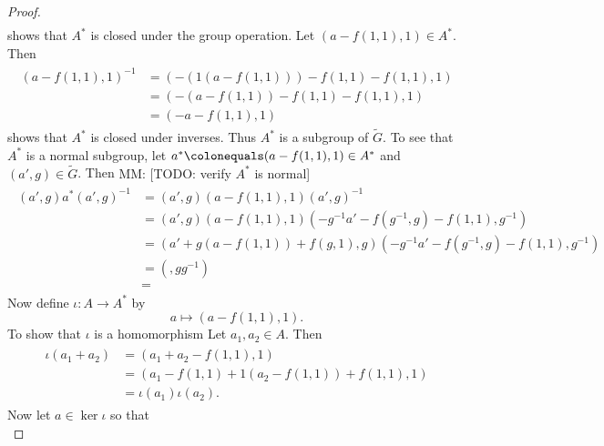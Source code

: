 \documentclass{dcthesis}
\newcommand{\mm}[1]{{\color{blue} \sf MM: [#1]}}
\newcommand{\wt}[1]{\widetilde{#1}}
\renewcommand{\ker}{\operatorname{ker}}
\theoremstyle{definition}
\theoremstyle{remark}
\numberwithin{equation}{section}
\numberwithin{figure}{section}
\begin{document}
{{\begin{proof}
\begin{align}
      \end{align}
      shows that $A^*$ is closed under the group operation.
      Let $(a-f(1,1),1)\in A^*$.
      Then
      \begin{align}
        \label{eqn:subgroupinversesAstar}
        \begin{split}
          (a-f(1,1),1)^{-1}
          &=(-(1(a-f(1,1)))-f(1,1)-f(1,1), 1)\\
          &=(-(a-f(1,1))-f(1,1)-f(1,1), 1)\\
          &=(-a-f(1,1), 1)
        \end{split}
      \end{align}
      shows that $A^*$ is closed under inverses.
      Thus $A^*$ is a subgroup of $\wt{G}$.
      To see that $A^*$ is a normal subgroup,
      let $a^*\colonequals (a-f(1,1),1)\in A^*$
      and $(a',g)\in\wt{G}$.
      Then
      \mm{TODO: verify $A^*$ is normal}
      \begin{align}
        \label{eqn:Astarnormal}
        \begin{split}
          (a',g)a^*(a',g)^{-1}
          &=(a',g)(a-f(1,1),1)(a',g)^{-1}\\
          &=(a',g)(a-f(1,1),1)(-g^{-1}a'-f(g^{-1},g)-f(1,1),g^{-1})\\
          &=(a'+g(a-f(1,1))+f(g,1),g)(-g^{-1}a'-f(g^{-1},g)-f(1,1),g^{-1})\\
          &=(,gg^{-1})\\
          &=
        \end{split}
      \end{align}
      Now define $\iota\colon A\to A^*$
      by
      \begin{equation}
        \label{eqn:iotaAstar}
        a\mapsto
        (a-f(1,1),1).
      \end{equation}
      To show that $\iota$ is a homomorphism
      Let $a_1,a_2\in A$.
      Then
      \begin{align}
        \label{eqn:iotahomo}
        \begin{split}
          \iota(a_1+a_2)
          &=(a_1+a_2-f(1,1),1)\\
          &=(a_1-f(1,1)+1(a_2-f(1,1))+f(1,1), 1)\\
          &=\iota(a_1)\iota(a_2).
        \end{split}
      \end{align}
      Now let $a\in\ker\iota$ so that
      \begin{equation}
        \label{eqn:keriota}

\end{equation}
\end{proof}}}
\end{document}
